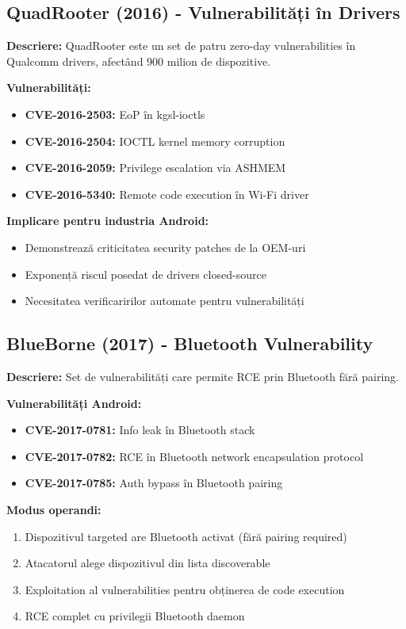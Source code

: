 \documentclass[11pt,a4paper,twocolumn]{article}
\theoremstyle{definition}
\theoremstyle{plain}
\theoremstyle{remark}
\begin{document}
\subsection{QuadRooter (2016) - Vulnerabilități în Drivers}

\textbf{Descriere:} QuadRooter este un set de patru zero-day vulnerabilities în Qualcomm drivers, 
afectând 900 milion de dispozitive.

\textbf{Vulnerabilități:}
\begin{itemize}
    \item \textbf{CVE-2016-2503:} EoP în kgsl-ioctls
    \item \textbf{CVE-2016-2504:} IOCTL kernel memory corruption
    \item \textbf{CVE-2016-2059:} Privilege escalation via ASHMEM
    \item \textbf{CVE-2016-5340:} Remote code execution în Wi-Fi driver
\end{itemize}

\textbf{Implicare pentru industria Android:}
\begin{itemize}
    \item Demonstrează criticitatea security patches de la OEM-uri
    \item Exponență riscul posedat de drivers closed-source
    \item Necesitatea verificaririlor automate pentru vulnerabilități
\end{itemize}

\subsection{BlueBorne (2017) - Bluetooth Vulnerability}

\textbf{Descriere:} Set de vulnerabilități care permite RCE prin Bluetooth fără pairing.

\textbf{Vulnerabilități Android:}
\begin{itemize}
    \item \textbf{CVE-2017-0781:} Info leak în Bluetooth stack
    \item \textbf{CVE-2017-0782:} RCE în Bluetooth network encapsulation protocol
    \item \textbf{CVE-2017-0785:} Auth bypass în Bluetooth pairing
\end{itemize}

\textbf{Modus operandi:}
\begin{enumerate}
    \item Dispozitivul targeted are Bluetooth activat (fără pairing required)
    \item Atacatorul alege dispozitivul din lista discoverable
    \item Exploitation al vulnerabilities pentru obținerea de code execution
    \item RCE complet cu privilegii Bluetooth daemon
\end{enumerate}
\end{document}
